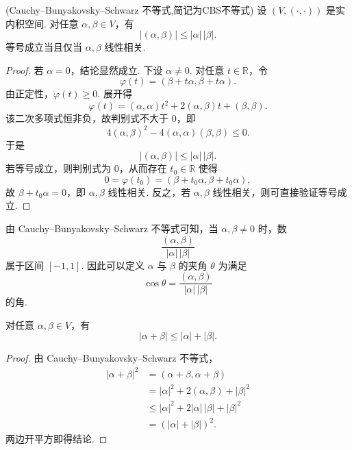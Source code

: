 \begin{theorem}(Cauchy--Bunyakovsky--Schwarz 不等式,简记为CBS不等式)
	设 $(V,(\cdot,\cdot))$ 是实内积空间. 对任意 $\alpha,\beta\in V$，有
	\[
	|(\alpha,\beta)|\leqslant |\alpha|\,|\beta|.
	\]
	等号成立当且仅当 $\alpha,\beta$ 线性相关.
\end{theorem}
\begin{proof}
	若 $\alpha=0$，结论显然成立. 下设 $\alpha\ne0$. 对任意 $t\in\mathbb{R}$，令
	\[
	\varphi(t)=(\beta+t\alpha,\beta+t\alpha).
	\]
	由正定性，$\varphi(t)\geqslant0$. 展开得
	\[
	\varphi(t)=(\alpha,\alpha)t^2+2(\alpha,\beta)t+(\beta,\beta).
	\]
	该二次多项式恒非负，故判别式不大于 $0$，即
	\[
	4(\alpha,\beta)^2-4(\alpha,\alpha)(\beta,\beta)\leqslant0.
	\]
	于是
	\[
	|(\alpha,\beta)|\leqslant |\alpha|\,|\beta|.
	\]
	若等号成立，则判别式为 $0$，从而存在 $t_0\in\mathbb{R}$ 使得
	\[
	0=\varphi(t_0)=(\beta+t_0\alpha,\beta+t_0\alpha),
	\]
	故 $\beta+t_0\alpha=0$，即 $\alpha,\beta$ 线性相关. 反之，若 $\alpha,\beta$ 线性相关，则可直接验证等号成立.
\end{proof}

由 Cauchy--Bunyakovsky--Schwarz 不等式可知，当 $\alpha,\beta\ne0$ 时，数
\[
\frac{(\alpha,\beta)}{|\alpha|\,|\beta|}
\]
属于区间 $[-1,1]$. 因此可以定义 $\alpha$ 与 $\beta$ 的夹角 $\theta$ 为满足
\[
\cos\theta=\frac{(\alpha,\beta)}{|\alpha|\,|\beta|}
\]
的角.

\begin{corollary}[三角不等式]
	对任意 $\alpha,\beta\in V$，有
	\[
	|\alpha+\beta|\leqslant |\alpha|+|\beta|.
	\]
\end{corollary}
\begin{proof}
	由 Cauchy--Bunyakovsky--Schwarz 不等式，
	\[
	\begin{aligned}
		|\alpha+\beta|^2
		&=(\alpha+\beta,\alpha+\beta)\\
		&=|\alpha|^2+2(\alpha,\beta)+|\beta|^2\\
		&\leqslant |\alpha|^2+2|\alpha|\,|\beta|+|\beta|^2\\
		&=(|\alpha|+|\beta|)^2.
	\end{aligned}
	\]
	两边开平方即得结论.
\end{proof}

